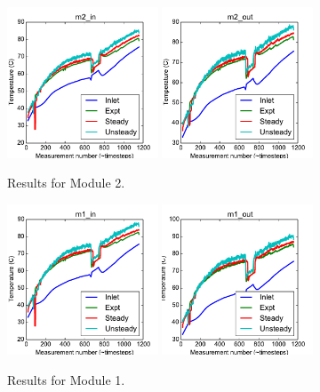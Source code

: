 \documentclass{article}
\begin{document}
\clearpage
\begin{figure}[!ht]
\centering
\includegraphics[width=0.4\textwidth]{../../data/ICSolar/images/Jan28_m2_in_compare.pdf}\hspace{0.05\textwidth}
\includegraphics[width=0.4\textwidth]{../../data/ICSolar/images/Jan28_m2_out_compare.pdf}\hspace{0.05\textwidth}\\
\caption{Results for Module 2.}\end{figure}
\begin{figure}[!ht]
\centering
\includegraphics[width=0.4\textwidth]{../../data/ICSolar/images/Jan28_m1_in_compare.pdf}\hspace{0.05\textwidth}
\includegraphics[width=0.4\textwidth]{../../data/ICSolar/images/Jan28_m1_out_compare.pdf}\hspace{0.05\textwidth}\\
\caption{Results for Module 1.}\end{figure}
\end{document}
